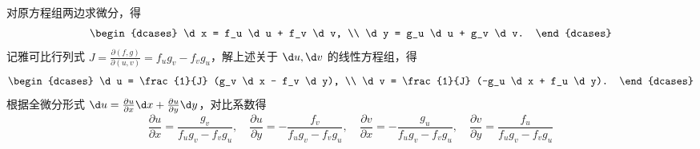 \begin{solution}

    对原方程组两边求微分，得
    \begin{equation}
        \begin{dcases}
            \d x = f_u \d u + f_v \d v, \\
            \d y = g_u \d u + g_v \d v.
        \end{dcases}
    \end{equation}
    记雅可比行列式 $J = \frac{\partial(f, g)}{\partial(u, v)} = f_u g_v - f_v g_u$，解上述关于 $\d u, \d v$ 的线性方程组，得
    \begin{equation}
        \begin{dcases}
            \d u = \frac{1}{J} (g_v \d x - f_v \d y), \\
            \d v = \frac{1}{J} (-g_u \d x + f_u \d y).
        \end{dcases}
    \end{equation}
    根据全微分形式 $\d u = \frac{\partial u}{\partial x} \d x + \frac{\partial u}{\partial y} \d y$，对比系数得
    \begin{equation}
        \boxed{\frac{\partial u}{\partial x} = \frac{g_v}{f_u g_v - f_v g_u}, \quad \frac{\partial u}{\partial y} = -\frac{f_v}{f_u g_v - f_v g_u}, \quad \frac{\partial v}{\partial x} = -\frac{g_u}{f_u g_v - f_v g_u}, \quad \frac{\partial v}{\partial y} = \frac{f_u}{f_u g_v - f_v g_u}}
    \end{equation}



\end{solution}
